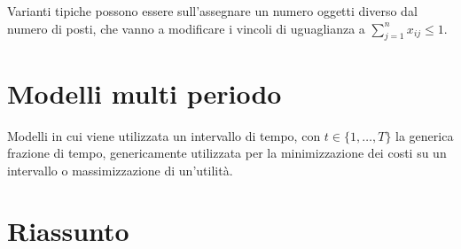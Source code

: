 \documentclass[\main/main.tex]{subfiles}
\begin{document}
Varianti tipiche possono essere sull'assegnare un numero oggetti diverso dal numero di posti, che vanno a modificare i vincoli di uguaglianza a $\sum_{j=1}^n x_{ij} \leq 1$.

\section{Modelli multi periodo}
Modelli in cui viene utilizzata un intervallo di tempo, con $t \in \{1, \ldots, T\}$ la generica frazione di tempo, genericamente utilizzata per la minimizzazione dei costi su un intervallo o massimizzazione di un'utilità.

\section{Riassunto}
\end{document}
